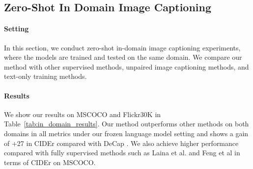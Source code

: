 



\subsection{Zero-Shot In Domain Image Captioning}
\paragraph{\textbf{Setting}} In this section, we conduct zero-shot in-domain image captioning experiments, where the models are trained and tested on the same domain. We compare our method with other supervised methods, unpaired image captioning methods, and text-only training methods. 

\paragraph{\textbf{Results}} We show our results on MSCOCO \cite{mscoco} and Flickr30K \cite{Flickr30k} in Table~\ref{tab:in_domain_results}. Our method outperforms other methods on both domains in all metrics under our frozen language model setting and shows a gain of +27 in CIDEr compared with DeCap \cite{DeCap}. We also achieve higher performance compared with fully supervised methods such as Laina et al. \cite{Laina2019TowardsUI} and Feng et al \cite{Feng2018UnsupervisedIC} in terms of CIDEr on MSCOCO.



